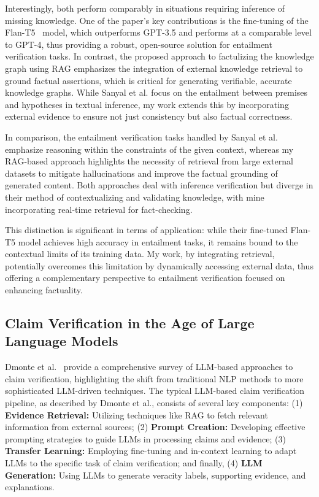 Interestingly, both perform comparably in situations requiring inference of missing knowledge.
One of the paper's key contributions is the fine-tuning of the Flan-T5~\cite{https://doi.org/10.48550/arxiv.2210.11416} model, which outperforms GPT-3.5 and performs at a comparable level to GPT-4, thus providing a robust, open-source solution for entailment verification tasks.
In contrast, the proposed approach to factulizing the knowledge graph using \ac{RAG} emphasizes the integration of external knowledge retrieval to ground factual assertions, which is critical for generating verifiable, accurate knowledge graphs.
While Sanyal et al. focus on the entailment between premises and hypotheses in textual inference, my work extends this by incorporating external evidence to ensure not just consistency but also factual correctness.

In comparison, the entailment verification tasks handled by Sanyal et al. emphasize reasoning within the constraints of the given context, whereas my \ac{RAG}-based approach highlights the necessity of retrieval from large external datasets to mitigate hallucinations and improve the factual grounding of generated content.
Both approaches deal with inference verification but diverge in their method of contextualizing and validating knowledge, with mine incorporating real-time retrieval for fact-checking.

This distinction is significant in terms of application: while their fine-tuned Flan-T5 model achieves high accuracy in entailment tasks, it remains bound to the contextual limits of its training data.
My work, by integrating retrieval, potentially overcomes this limitation by dynamically accessing external data, thus offering a complementary perspective to entailment verification focused on enhancing factuality.

\subsection{Claim Verification in the Age of Large Language Models}\label{subsec:claim-verification-in-the-age-of-large-language-models}
Dmonte et al.~\cite{dmonte2024claimverificationagelarge} provide a comprehensive survey of \ac{LLM}-based approaches to claim verification, highlighting the shift from traditional \ac{NLP} methods to more sophisticated LLM-driven techniques.
The typical LLM-based claim verification pipeline, as described by Dmonte et al., consists of several key components:
(1) \textbf{Evidence Retrieval:} Utilizing techniques like \ac{RAG} to fetch relevant information from external sources;
(2) \textbf{Prompt Creation:} Developing effective prompting strategies to guide LLMs in processing claims and evidence;
(3) \textbf{Transfer Learning:} Employing fine-tuning and in-context learning to adapt LLMs to the specific task of claim verification;
and finally, (4) \textbf{LLM Generation:} Using LLMs to generate veracity labels, supporting evidence, and explanations.

